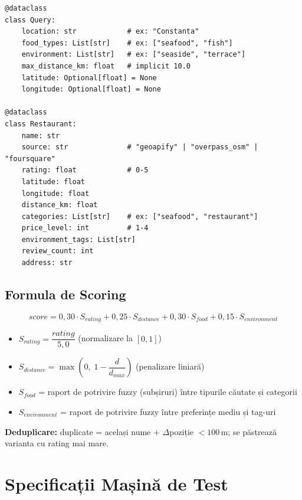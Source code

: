 \documentclass[12pt,a4paper]{article}
\begin{document}
\begin{lstlisting}[caption={Clasele principale de date (models.py)}]
@dataclass
class Query:
    location: str            # ex: "Constanta"
    food_types: List[str]    # ex: ["seafood", "fish"]
    environment: List[str]   # ex: ["seaside", "terrace"]
    max_distance_km: float   # implicit 10.0
    latitude: Optional[float] = None
    longitude: Optional[float] = None

@dataclass
class Restaurant:
    name: str
    source: str              # "geoapify" | "overpass_osm" | "foursquare"
    rating: float            # 0-5
    latitude: float
    longitude: float
    distance_km: float
    categories: List[str]    # ex: ["seafood", "restaurant"]
    price_level: int         # 1-4
    environment_tags: List[str]
    review_count: int
    address: str
\end{lstlisting}

\subsection{Formula de Scoring}

\begin{formulabox}
\[
score = 0{,}30 \cdot S_{rating}
      + 0{,}25 \cdot S_{distance}
      + 0{,}30 \cdot S_{food}
      + 0{,}15 \cdot S_{environment}
\]
\begin{itemize}[noitemsep]
  \item $S_{rating} = \dfrac{rating}{5{,}0}$ \hfill (normalizare la $[0,1]$)
  \item $S_{distance} = \max\!\left(0,\; 1 - \dfrac{d}{d_{max}}\right)$ \hfill (penalizare liniară)
  \item $S_{food}$ = raport de potrivire fuzzy (subșiruri) între tipurile căutate și categorii
  \item $S_{environment}$ = raport de potrivire fuzzy între preferințe mediu și tag-uri
\end{itemize}
\textbf{Deduplicare:} duplicate = același nume + $\Delta$poziție $< 100\,$m; se păstrează varianta cu rating mai mare.
\end{formulabox}

\section{Specificații Mașină de Test}
\end{document}
